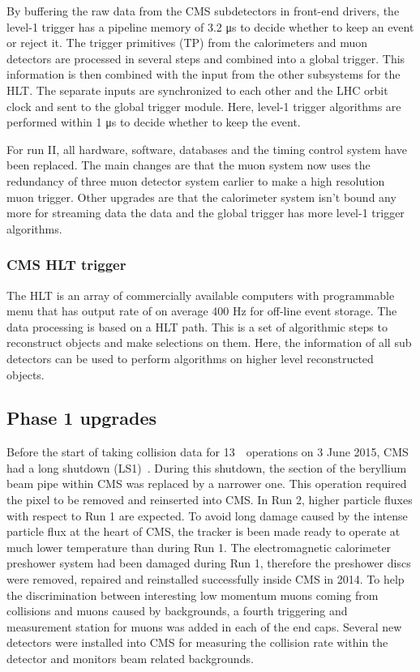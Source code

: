 By buffering the raw data from the CMS subdetectors in front-end drivers, the level-1 trigger has a pipeline memory of 3.2 \si{ \micro \second} to decide whether to keep an event or reject it. 
The trigger primitives (TP) from the calorimeters and muon detectors are processed in several steps and combined into a global trigger. This information is then combined with the input from the other subsystems for the HLT. The separate inputs are synchronized to each other and the LHC orbit clock and sent to the global trigger module. Here, level-1 trigger algorithms are performed within 1 \si{ \micro \second} to decide whether to  keep the event. 

For run II, all hardware, software, databases and the timing control system have been replaced. The main changes are that the muon system now uses the redundancy of three muon detector system earlier to make a high resolution muon trigger. Other upgrades are that the calorimeter system isn't bound any more for streaming data the data and the global trigger has more level-1 trigger algorithms. 

\subsubsection*{CMS HLT trigger}
The HLT is an array of commercially available computers with programmable menu that has output rate of on average 400 \si{ \hertz} for off-line event storage.
The data processing is based on a HLT path. This is a  set of algorithmic steps to reconstruct objects and make selections on them.  Here, the information of all sub detectors can be used to perform algorithms on higher level reconstructed objects. 

\subsection{Phase 1 upgrades}
\label{sec:Phase1}
Before the start of taking collision data for 13~\TeV\ operations on 3 June 2015, CMS had a long shutdown (LS1)~\cite{Pralavorio:2024977}. During this shutdown, the section of the beryllium beam pipe within CMS was replaced by a narrower one. This operation required the pixel to be  removed and reinserted into CMS. In Run 2, higher particle fluxes with respect to Run 1 are expected. To avoid long damage caused by the intense particle flux at the heart of CMS, the tracker is been made ready to operate at much lower temperature than during Run 1.  The electromagnetic calorimeter preshower system had been damaged during Run 1, therefore the preshower discs were removed, repaired and reinstalled successfully inside CMS in 2014. To help the discrimination between interesting low momentum muons coming from collisions and muons caused by backgrounds, a fourth triggering and measurement station for muons was added in each of the end caps. Several new detectors were installed into CMS for measuring the collision rate within the detector and monitors beam related backgrounds. 

